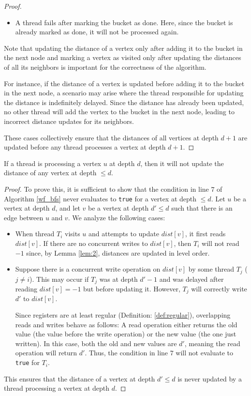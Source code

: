 \begin{proof}
\begin{itemize}
    \item A thread fails after marking the bucket as done. Here, since the bucket is already marked as done, it will not be processed again.
\end{itemize}

Note that updating the distance of a vertex only after adding it to the bucket in the next node and marking a vertex as visited only after updating the distances of all its neighbors is important for the correctness of the algorithm.

For instance, if the distance of a vertex is updated before adding it to the bucket in the next node, a scenario may arise where the thread responsible for updating the distance is indefinitely delayed. Since the distance has already been updated, no other thread will add the vertex to the bucket in the next node, leading to incorrect distance updates for its neighbors.

These cases collectively ensure that the distances of all vertices at depth $d+1$ are updated before any thread processes a vertex at depth $d+1$.
\end{proof}

\begin{lemma}
\label{lem:3}
If a thread is processing a vertex $u$ at depth $d$, then it will not update the distance of any vertex at depth $\leq d$.
\end{lemma}
\begin{proof}
To prove this, it is sufficient to show that the condition in line $7$ of Algorithm \ref{wf_bfs} never evaluates to \texttt{true} for a vertex at depth $\leq d$. Let $u$ be a vertex at depth $d$, and let $v$ be a vertex at depth $d' \leq d$ such that there is an edge between $u$ and $v$. We analyze the following cases:
\begin{itemize}
    \item When thread $T_i$ visits $u$ and attempts to update $dist[v]$, it first reads $dist[v]$. If there are no concurrent writes to $dist[v]$, then $T_i$ will not read $-1$ since, by Lemma \ref{lem:2}, distances are updated in level order.

    \item Suppose there is a concurrent write operation on $dist[v]$ by some thread $T_j$ ($j \neq i$). This may occur if $T_j$ was at depth $d'-1$ and was delayed after reading $dist[v] = -1$ but before updating it. However, $T_j$ will correctly write $d'$ to $dist[v]$.
    
    Since registers are at least regular (Definition: \ref{def:regular}), overlapping reads and writes behave as follows: A read operation either returns the old value (the value before the write operation) or the new value (the one just written). In this case, both the old and new values are $d'$, meaning the read operation will return $d'$. Thus, the condition in line $7$ will not evaluate to \texttt{true} for $T_i$.
\end{itemize}

This ensures that the distance of a vertex at depth $d' \leq d$ is never updated by a thread processing a vertex at depth $d$.
\end{proof}

